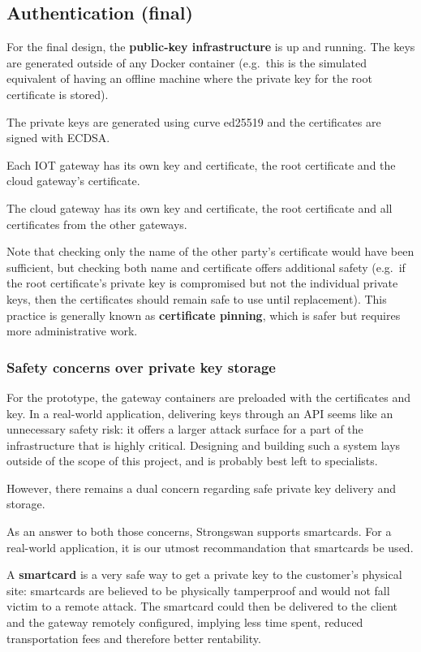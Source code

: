 \documentclass[paper=a4, fontsize=11pt]{scrartcl}
\begin{document}
\subsection{Authentication (final)}

For the final design, the \textbf{public-key infrastructure} is up and running.
The keys are generated outside of any Docker container (e.g.\ this is the
simulated equivalent of having an offline machine where the private key for the
root certificate is stored).

The private keys are generated using curve ed25519 and the certificates are
signed with ECDSA\@.

Each IOT gateway has its own key and certificate, the root certificate and the
cloud gateway's certificate.

The cloud gateway has its own key and certificate, the root certificate and all
certificates from the other gateways.

Note that checking only the name of the other party's certificate would have
been sufficient, but checking both name and certificate offers additional safety
(e.g.\ if the root certificate's private key is compromised but not the
individual private keys, then the certificates should remain safe to use until
replacement).
This practice is generally known as \textbf{certificate pinning}, which is safer
but requires more administrative work.

\subsubsection{Safety concerns over private key storage} \label{pkis}

For the prototype, the gateway containers are preloaded with the certificates
and key.
In a real-world application, delivering keys through an API seems like an
unnecessary safety risk: it offers a larger attack surface for a part of the
infrastructure that is highly critical.
Designing and building such a system lays outside of the scope of this project,
and is probably best left to specialists.

However, there remains a dual concern regarding safe private key delivery and
storage.

As an answer to both those concerns, Strongswan supports smartcards.
For a real-world application, it is our utmost recommandation that
smartcards be used.

A \textbf{smartcard} is a very safe way to get a private key to the customer's
physical site: smartcards are believed to be physically tamperproof and would
not fall victim to a remote attack.
The smartcard could then be delivered to the client and the gateway remotely
configured, implying less time spent, reduced transportation fees and
therefore better rentability.
\end{document}
